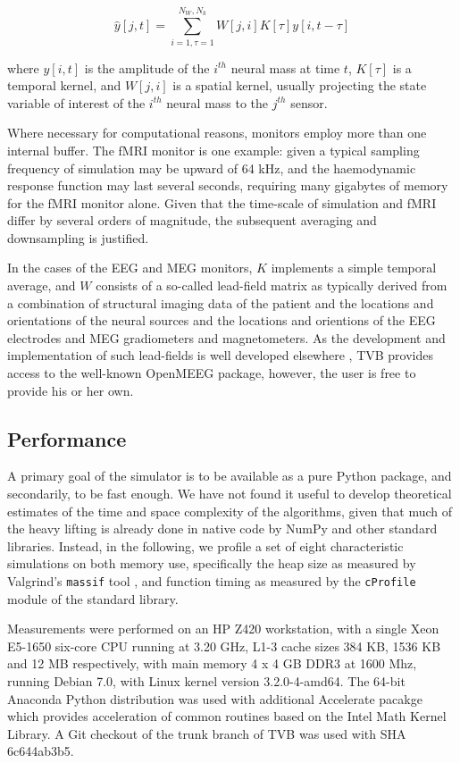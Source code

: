 	\[ \hat{y}[j, t] = \sum_{i=1, \tau=1}^{N_W, N_k} W[j, i] K[\tau] y[i, t-\tau] \]

	\noindent where $y[i, t]$ is the amplitude of the $i^{th}$ neural mass at time
	$t$, $K[\tau]$ is a temporal kernel, and $W[j, i]$ is a spatial kernel,
	usually projecting the state variable of interest of the $i^{th}$ 
	neural mass to the $j^{th}$ sensor. 

	Where necessary for computational reasons, monitors employ more than 
	one internal buffer. The fMRI monitor is one 
	example: given a typical sampling frequency of simulation may be upward of 
	64 kHz, and the haemodynamic response function may last several seconds, 
	requiring many gigabytes of memory for the fMRI monitor alone. Given that 
	the time-scale of simulation and fMRI differ by several orders of magnitude, 
	the subsequent averaging and downsampling is justified. 

	In the cases of the EEG and MEG monitors, $K$ implements a simple
	temporal average, and $W$ consists of a so-called lead-field matrix as typically
	derived from a combination of structural imaging data of the patient 
	and the locations and orientations of the neural sources and the locations
	and orientions of the EEG electrodes and MEG gradiometers and magnetometers. 
	As the development and implementation of such lead-fields is well developed
	elsewhere \cite{Jirsa_2002,Nolte2003,Gramfort_2010}, TVB provides access
	to the well-known OpenMEEG package, however, the user is free to provide 
	his or her own.

\subsection{Performance}

	A primary goal of the simulator is to be available as a pure Python package,
	and secondarily, to be fast enough. We have not found it useful to 
	develop theoretical estimates of the time and space complexity of the 
	algorithms, given that much of the heavy lifting is already done in native
	code by NumPy and other standard libraries. Instead, 
	in the following, we profile a set of eight characteristic simulations
	on both memory use, specifically the heap size as measured by Valgrind's 
	\texttt{massif} tool \cite{valgrind2007}, and function timing as measured by the 
	\texttt{cProfile} module of the standard library. 
	
	Measurements were
	performed on an HP Z420 workstation, with a single Xeon E5-1650
	six-core CPU running at 3.20 GHz, L1-3 cache sizes 384 KB, 1536 KB
	and 12 MB respectively, with main memory 4 x 4 GB DDR3 at 1600 Mhz,
	running Debian 7.0, with Linux kernel version 3.2.0-4-amd64. 
	The 64-bit Anaconda Python distribution was used with additional Accelerate
	pacakge which provides acceleration of common routines based on the 
	Intel Math Kernel Library. A Git checkout of the trunk branch of TVB 
	was used with SHA 6c644ab3b5.

